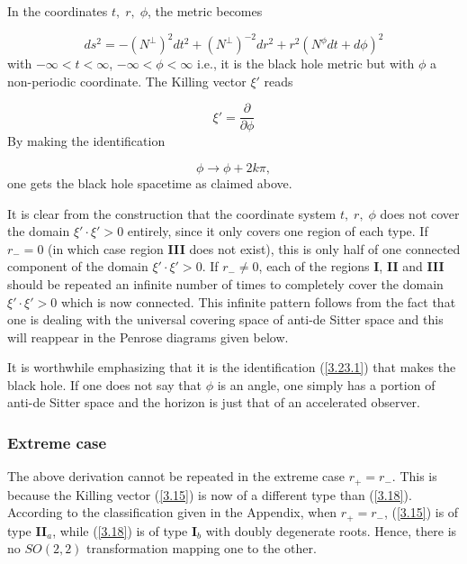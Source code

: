 \documentclass[12pt]{article}
\newcounter{c1} \newcounter{c2}
\newcommand{\bb}{\begin{equation}}
\newcommand{\ee}{\end{equation}}
\newcommand{\p}{\partial}
\begin{document}
In the coordinates $t,\; r,\; \phi$, the metric becomes

\bb
ds^2 = -(N^{\perp})^2dt^2 + (N^{\perp})^{-2}dr^2 + r^2(N^{\phi}
dt + d\phi)^2
\label{3.22}
\ee
%
with $- \infty < t < \infty$, $-\infty < \phi < \infty$ i.e., it is the black
hole metric but with $\phi$ a non-periodic coordinate. The
Killing vector $\xi '$ reads

\bb
\xi ' = \frac{\p}{\p \phi}
\label{3.23}
\ee
%
By making the identification

\bb
\phi \rightarrow \phi + 2k\pi,
\label{3.23.1}
\ee
%
one gets the black hole spacetime as claimed above.

It is clear from the construction that the coordinate system
$t,\; r,\; \phi$ does not cover the domain $\xi ' \cdot \xi '
>0$ entirely, since it only covers one region of each type. If
$r_{-} = 0$  (in which case region {\bf III} does not exist), this is only
half
 of one connected component of the
domain $\xi ' \cdot \xi ' >0$. If $r_{-} \neq 0$, each of the
regions {\bf I}, {\bf II} and {\bf III} should be repeated an
infinite number of times to completely cover the domain $\xi '
\cdot \xi ' >0$ which is now connected.  This infinite pattern
follows from the fact that one is dealing with the universal
covering space of anti-de Sitter space and this will reappear in
the Penrose diagrams given below.

It is worthwhile emphasizing that it is the identification
(\ref{3.23.1}) that makes the black hole. If one does not say
that $\phi$ is an angle, one simply has a portion of anti-de
Sitter space and the horizon is just that of an accelerated observer\cite{9}.



\subsubsection{Extreme case}

The above derivation cannot be repeated in the extreme case
$r_{+} = r_{-}$. This is because the Killing vector (\ref{3.15})
is now of a different type than (\ref{3.18}). According to the
classification given in the Appendix, when $r_{+} = r_{-}$,
(\ref{3.15}) is of type {\bf II}$_a$, while (\ref{3.18}) is of type
{\bf I}$_b$ with doubly degenerate roots. Hence, there is no
$SO(2,2)$ transformation mapping one to the other.
\end{document}
